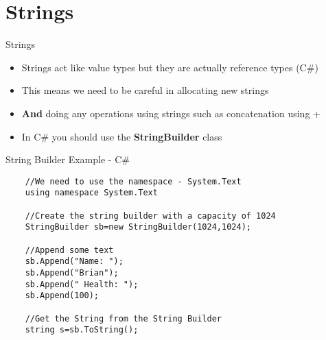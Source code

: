 \part{Strings}
\frame{\partpage}

\begin{frame}{Strings}
	\begin{itemize}
		\item Strings act like value types but they are actually reference types (C\#)
		\item This means we need to be careful in allocating new strings
		\item \textbf{And} doing any operations using strings such as concatenation using +
		\item In C\# you should use the \textbf{StringBuilder} class 
	\end{itemize}
\end{frame}

\begin{frame}[fragile]{String Builder Example - C\#}
	\begin{lstlisting}
	//We need to use the namespace - System.Text
	using namespace System.Text
	
	//Create the string builder with a capacity of 1024
	StringBuilder sb=new StringBuilder(1024,1024);
	
	//Append some text
	sb.Append("Name: ");
	sb.Append("Brian");
	sb.Append(" Health: ");
	sb.Append(100);
	
	//Get the String from the String Builder
	string s=sb.ToString();
	\end{lstlisting}
\end{frame}